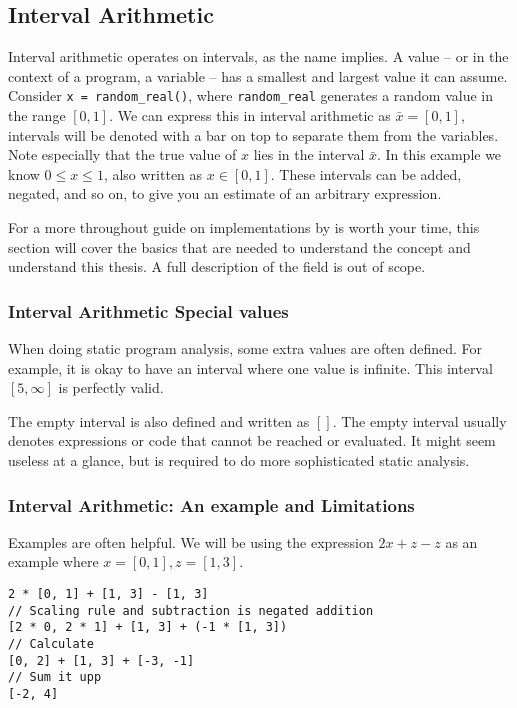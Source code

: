 \documentclass[msc,lith,english]{liuthesis}
\begin{document}
\subsection{Interval Arithmetic}
Interval arithmetic operates on intervals, as the name implies. A value -- or in the context of a program, a variable -- has a smallest and largest value it can assume. Consider \verb`x = random_real()`, where \verb`random_real` generates a random value in the range $[0, 1]$. We can express this in interval arithmetic as $\bar{x} = [0, 1]$, intervals will be denoted with a bar on top to separate them from the variables. Note especially that the true value of $x$ lies in the interval $\bar{x}$. In this example we know $0 \leq x \leq 1$, also written as $x \in [0, 1]$. These intervals can be added, negated, and so on, to give you an estimate of an arbitrary expression.

For a more throughout guide on implementations  by \citeauthor{src:affAri} is worth your time, this section will cover the basics that are needed to understand the concept and understand this thesis. A full description of the field is out of scope.

\subsubsection{Interval Arithmetic Special values}
When doing static program analysis, some extra values are often defined. For example, it is okay to have an interval where one value is infinite. This interval $[5, \infty]$ is perfectly valid.

The empty interval is also defined and written as $[]$. The empty interval usually denotes expressions or code that cannot be reached or evaluated. It might seem useless at a glance, but is required to do more sophisticated static analysis.

\subsubsection{Interval Arithmetic: An example and Limitations}
Examples are often helpful.
We will be using the expression $2x + z - z$ as an example where $x = [0, 1], z = [1, 3]$.

\begin{verbatim}
2 * [0, 1] + [1, 3] - [1, 3]
// Scaling rule and subtraction is negated addition 
[2 * 0, 2 * 1] + [1, 3] + (-1 * [1, 3])
// Calculate
[0, 2] + [1, 3] + [-3, -1]
// Sum it upp
[-2, 4]
\end{verbatim}
\end{document}
